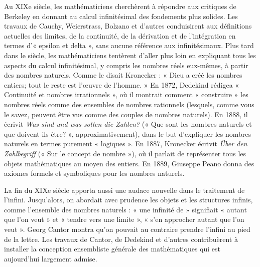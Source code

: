 \documentclass[../../../include/open-logic-section]{subfiles}
\begin{document}
Au XIXe siècle, les mathématiciens cherchèrent à répondre aux
critiques de Berkeley en donnant au calcul infinitésimal des
fondements plus solides. Les travaux de Cauchy, Weierstrass,
Bolzano et d'autres conduisirent aux définitions actuelles des
limites, de la continuité, de la dérivation et de l'intégration en
termes d'« epsilon et delta », sans aucune référence aux
infinitésimaux. Plus tard dans le siècle, les mathématiciens
tentèrent d'aller plus loin en expliquant tous les aspects du
calcul infinitésimal, y compris les nombres réels eux-mêmes, à
partir des nombres naturels. Comme le disait Kronecker : « Dieu a
créé les nombres entiers; tout le reste est l'œuvre de l'homme. »
En 1872, Dedekind rédigea « Continuité et nombres irrationnels »,
où il montrait comment « construire » les nombres réels comme des
ensembles de nombres rationnels (lesquels, comme vous le savez,
peuvent être vus comme des couples de nombres naturels). En 1888,
il écrivit \emph{Was sind und was sollen die Zahlen?} (« Que sont
les nombres naturels et que doivent-ils être? », approximativement),
dans le but d'expliquer les nombres naturels en termes purement
« logiques ». En 1887, Kronecker écrivit \emph{\"Uber den
Zahlbegriff} (« Sur le concept de nombre »), où il parlait de
représenter tous les objets mathématiques au moyen des entiers. En
1889, Giuseppe Peano donna des axiomes formels et symboliques pour
les nombres naturels.

La fin du XIXe siècle apporta aussi une audace nouvelle dans le
traitement de l'infini. Jusqu'alors, on abordait avec prudence les
objets et les structures infinis, comme l'ensemble des nombres
naturels : « une infinité de » signifiait « autant que l'on veut »
et « tendre vers une limite », « s'en approcher autant que l'on
veut ». Georg Cantor montra qu'on pouvait au contraire prendre
l'infini au pied de la lettre. Les travaux de Cantor, de Dedekind
et d'autres contribuèrent à installer la conception ensembliste
générale des mathématiques qui est aujourd'hui largement admise.
\end{document}
